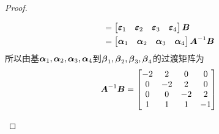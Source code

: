 \begin{proof}
\begin{enumerate}
{\begin{align*}
                   & =\begin{bmatrix}\boldsymbol{\varepsilon}_1&\boldsymbol{\varepsilon}_2&\boldsymbol{\varepsilon}_3&\boldsymbol{\varepsilon}_4\end{bmatrix}\boldsymbol{B}    \\
                   & =\begin{bmatrix}\boldsymbol{\alpha}_1&\boldsymbol{\alpha}_2&\boldsymbol{\alpha}_3&\boldsymbol{\alpha}_4\end{bmatrix}{\boldsymbol{A}}^{-1}\boldsymbol{B}
              \end{align*}
              所以由基\(\boldsymbol{\alpha}_1,\boldsymbol{\alpha}_2,\boldsymbol{\alpha}_3,\boldsymbol{\alpha}_4\)到\(\boldsymbol{\beta}_1,\boldsymbol{\beta}_2,\boldsymbol{\beta}_3,\boldsymbol{\beta}_4\)的过渡矩阵为
              \begin{equation*}
                  {\boldsymbol{A}}^{-1}\boldsymbol{B}=
                  \begin{bmatrix}
                      -2 & 2  & 0  & 0  \\
                      0  & -2 & 2  & 0  \\
                      0  & 0  & -2 & 2  \\
                      1  & 1  & 1  & -1
                  \end{bmatrix}
              \end{equation*}
              }
    \end{enumerate}
\end{proof}

